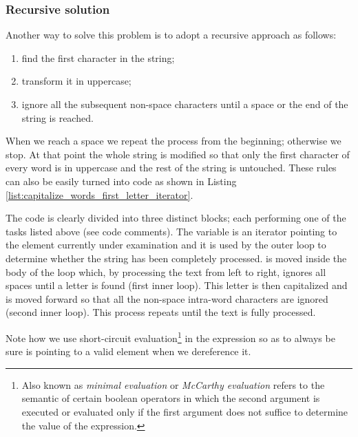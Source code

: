 \subsubsection{Recursive solution}

Another way to solve this problem is to adopt a recursive approach as follows:
\begin{enumerate}
	\item find the first character in the string; 
	\item transform it in uppercase;
	\item ignore all the subsequent non-space characters until a space or the end of the string is reached.
\end{enumerate}
When we reach a space we repeat the process from the beginning; otherwise we stop.  At that point the whole string is modified so that only the first character of every word is in uppercase and the rest of the string is untouched.
These rules can also be easily turned into code as shown in Listing \ref{list:capitalize_words_first_letter_iterator}.



The code is clearly divided into three distinct blocks; each performing one of the tasks listed above (see code comments).
The variable  is an iterator pointing to the element currently under examination and it is used by the outer loop to determine whether the string has been completely processed.
 is moved inside the body of the loop which, by processing the text from left to right, ignores all spaces until a letter is found (first inner loop).
This letter is then capitalized and   is moved forward so that all the non-space intra-word characters are ignored (second inner loop).
This process repeats until the text is fully processed. 


Note how we use short-circuit evaluation\footnote{Also known as \textit{minimal evaluation} or \textit{McCarthy evaluation} refers to the semantic of certain boolean operators in which the second argument is executed or evaluated only if the first argument does not suffice to determine the value of the expression.}\cite{cit:wiki:shortcircuit}
in the  expression so as to always be sure  is pointing to a valid element when we dereference it.

